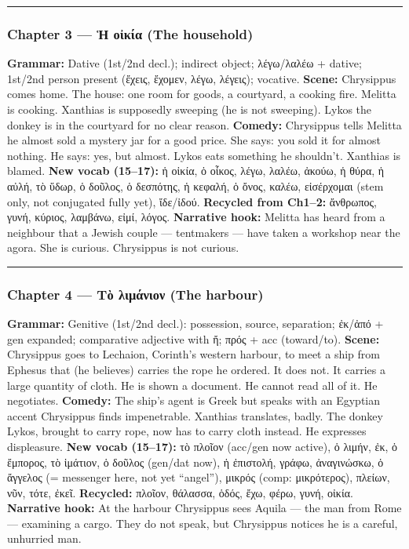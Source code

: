 \documentclass[a4paper]{report}
\begin{document}
\begin{center}\rule{0.5\linewidth}{0.5pt}\end{center}

\subsubsection{Chapter 3 --- Ἡ οἰκία (The
household)}\label{chapter-3-ux1f21-ux3bfux1f30ux3baux3afux3b1-the-household}

\textbf{Grammar:} Dative (1st/2nd decl.); indirect object; λέγω/λαλέω +
dative; 1st/2nd person present (ἔχεις, ἔχομεν, λέγω, λέγεις); vocative.
\textbf{Scene:} Chrysippus comes home. The house: one room for goods, a
courtyard, a cooking fire. Melitta is cooking. Xanthias is supposedly
sweeping (he is not sweeping). Lykos the donkey is in the courtyard for
no clear reason. \textbf{Comedy:} Chrysippus tells Melitta he almost
sold a mystery jar for a good price. She says: you sold it for almost
nothing. He says: yes, but almost. Lykos eats something he shouldn't.
Xanthias is blamed. \textbf{New vocab (15--17):} ἡ οἰκία, ὁ οἶκος, λέγω,
λαλέω, ἀκούω, ἡ θύρα, ἡ αὐλή, τὸ ὕδωρ, ὁ δοῦλος, ὁ δεσπότης, ἡ κεφαλή, ὁ
ὄνος, καλέω, εἰσέρχομαι (stem only, not conjugated fully yet), ἴδε/ἰδού.
\textbf{Recycled from Ch1--2:} ἄνθρωπος, γυνή, κύριος, λαμβάνω, εἰμί,
λόγος. \textbf{Narrative hook:} Melitta has heard from a neighbour that
a Jewish couple --- tentmakers --- have taken a workshop near the agora.
She is curious. Chrysippus is not curious.

\begin{center}\rule{0.5\linewidth}{0.5pt}\end{center}

\subsubsection{Chapter 4 --- Τὸ λιμάνιον (The
harbour)}\label{chapter-4-ux3c4ux1f78-ux3bbux3b9ux3bcux3acux3bdux3b9ux3bfux3bd-the-harbour}

\textbf{Grammar:} Genitive (1st/2nd decl.): possession, source,
separation; ἐκ/ἀπό + gen expanded; comparative adjective with ἤ; πρός +
acc (toward/to). \textbf{Scene:} Chrysippus goes to Lechaion, Corinth's
western harbour, to meet a ship from Ephesus that (he believes) carries
the rope he ordered. It does not. It carries a large quantity of cloth.
He is shown a document. He cannot read all of it. He negotiates.
\textbf{Comedy:} The ship's agent is Greek but speaks with an Egyptian
accent Chrysippus finds impenetrable. Xanthias translates, badly. The
donkey Lykos, brought to carry rope, now has to carry cloth instead. He
expresses displeasure. \textbf{New vocab (15--17):} τὸ πλοῖον (acc/gen
now active), ὁ λιμήν, ἐκ, ὁ ἔμπορος, τὸ ἱμάτιον, ὁ δοῦλος (gen/dat now),
ἡ ἐπιστολή, γράφω, ἀναγινώσκω, ὁ ἄγγελος (= messenger here, not yet
``angel''), μικρός (comp: μικρότερος), πλείων, νῦν, τότε, ἐκεῖ.
\textbf{Recycled:} πλοῖον, θάλασσα, ὁδός, ἔχω, φέρω, γυνή, οἰκία.
\textbf{Narrative hook:} At the harbour Chrysippus sees Aquila --- the
man from Rome --- examining a cargo. They do not speak, but Chrysippus
notices he is a careful, unhurried man.
\end{document}
